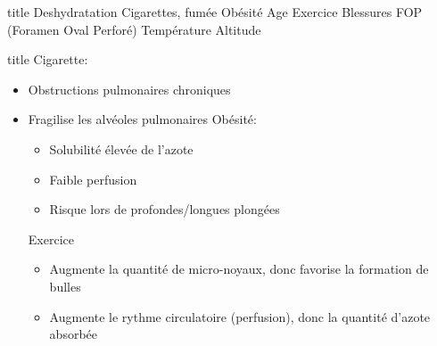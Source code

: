 
\begin{frame}{title}  
	Deshydratation
	Cigarettes, fumée
	Obésité
	Age
	Exercice
	Blessures
	FOP (Foramen Oval Perforé)
	Température
	Altitude
\end{frame}

\begin{frame}{title}  
	Cigarette:
	\begin{itemize}
		\item Obstructions pulmonaires chroniques
		\item Fragilise les alvéoles pulmonaires
	Obésité:
	\begin{itemize}
		\item Solubilité élevée de l'azote
		\item Faible perfusion
		\item Risque lors de profondes/longues plongées
	\end{itemize}
	Exercice
	\begin{itemize}
		\item Augmente la quantité de micro-noyaux, donc favorise la formation de bulles
		\item Augmente le rythme circulatoire (perfusion), donc la quantité d'azote absorbée
	\end{itemize}
	\end{itemize}
\end{frame}
